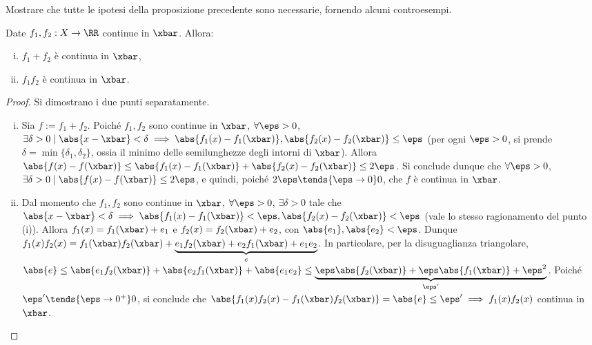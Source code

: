 \documentclass[11pt]{article}
\begin{document}
	\begin{exercise}
		Mostrare che tutte le ipotesi della proposizione precedente sono necessarie, fornendo alcuni controesempi.
	\end{exercise}

	\begin{proposition}
		Date $f_1, f_2 : X \to \RR$ continue in $\xbar$. Allora:
		
		\begin{enumerate}[(i)]
			\item $f_1 + f_2$ è continua in $\xbar$,
			\item $f_1 f_2$ è continua in $\xbar$.
		\end{enumerate}
	\end{proposition}

	\begin{proof}
		Si dimostrano i due punti separatamente.
		
		\begin{enumerate}[(i)]
			\item Sia $f := f_1 + f_2$. Poiché $f_1, f_2$ sono continue in $\xbar$,
			$\forall \eps > 0$, $\exists \delta > 0 \mid \abs{x - \xbar} < \delta
			\implies \abs{f_1(x) - f_1(\xbar)}, \abs{f_2(x) - f_2(\xbar)} \leq \eps$ (per ogni $\eps > 0$, si prende $\delta = \min\{\delta_1, \delta_2\}$, ossia il minimo delle semilunghezze degli intorni
			di $\xbar$). Allora $\abs{f(x) - f(\xbar)} \leq
			\abs{f_1(x) - f_1(\xbar)} + \abs{f_2(x) - f_2(\xbar)} \leq 2\eps$.
			Si conclude dunque che $\forall \eps > 0$, $\exists \delta > 0
			\mid \abs{f(x) - f(\xbar)} \leq 2\eps$, e quindi, poiché
			$2\eps \tends{\eps \to 0} 0$, che $f$ è continua in $\xbar$.
			
			\item Dal momento che $f_1, f_2$ sono continue in $\xbar$,
			$\forall \eps > 0$, $\exists \delta > 0$ tale che $\abs{x - \xbar} < \delta \implies \abs{f_1(x) - f_1(\xbar)} < \eps, \abs{f_2(x)
			- f_2(\xbar)} < \eps$ (vale lo stesso ragionamento del punto
			(i)). Allora $f_1(x) = f_1(\xbar) + e_1$ e
			$f_2(x) = f_2(\xbar) + e_2$, con $\abs{e_1}, \abs{e_2} < \eps$.
			Dunque $f_1(x)f_2(x) = f_1(\xbar)f_2(\xbar) + \underbrace{e_1 f_2(\xbar) +
			e_2 f_1(\xbar) + e_1 e_2}_e$. In particolare, per la
			disuguaglianza triangolare, $\abs{e} \leq \abs{e_1 f_2(\xbar)} +
			\abs{e_2 f_1(\xbar)} + \abs{e_1 e_2} \leq \underbrace{\eps \abs{f_2(\xbar)} +
			\eps \abs{f_1(\xbar)} + \eps^2}_{\eps'}$. Poiché $\eps' \tends{\eps \to 0^+} 0$, si conclude che $\abs{f_1(x) f_2(x) - f_1(\xbar) f_2(\xbar)} = \abs{e} \leq \eps' \implies f_1(x)f_2(x)$ continua
			in $\xbar$.
		\end{enumerate}
	\end{proof}
\end{document}
